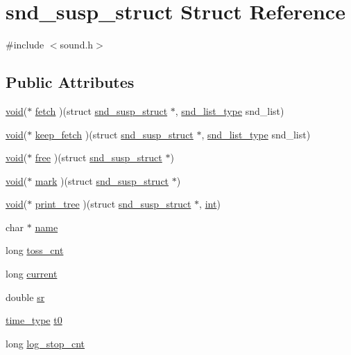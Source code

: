 \hypertarget{structsnd__susp__struct}{}\section{snd\+\_\+susp\+\_\+struct Struct Reference}
\label{structsnd__susp__struct}


{\ttfamily \#include $<$sound.\+h$>$}

\subsection*{Public Attributes}
\begin{DoxyCompactItemize}
\item 
\hyperlink{sound_8c_ae35f5844602719cf66324f4de2a658b3}{void}($\ast$ \hyperlink{structsnd__susp__struct_addb182d5c03b9b8f864e4fd9871f7722}{fetch} )(struct \hyperlink{structsnd__susp__struct}{snd\+\_\+susp\+\_\+struct} $\ast$, \hyperlink{sound_8h_ab05388854adb60c2855a70276d2ceb65}{snd\+\_\+list\+\_\+type} snd\+\_\+list)
\item 
\hyperlink{sound_8c_ae35f5844602719cf66324f4de2a658b3}{void}($\ast$ \hyperlink{structsnd__susp__struct_aef3e12bfaaf19ddbdb630ab20d40c3f7}{keep\+\_\+fetch} )(struct \hyperlink{structsnd__susp__struct}{snd\+\_\+susp\+\_\+struct} $\ast$, \hyperlink{sound_8h_ab05388854adb60c2855a70276d2ceb65}{snd\+\_\+list\+\_\+type} snd\+\_\+list)
\item 
\hyperlink{sound_8c_ae35f5844602719cf66324f4de2a658b3}{void}($\ast$ \hyperlink{structsnd__susp__struct_a39cc18ad890efb4f088c9d7636e3b5c0}{free} )(struct \hyperlink{structsnd__susp__struct}{snd\+\_\+susp\+\_\+struct} $\ast$)
\item 
\hyperlink{sound_8c_ae35f5844602719cf66324f4de2a658b3}{void}($\ast$ \hyperlink{structsnd__susp__struct_a077478e200df3bc42489892597f15d47}{mark} )(struct \hyperlink{structsnd__susp__struct}{snd\+\_\+susp\+\_\+struct} $\ast$)
\item 
\hyperlink{sound_8c_ae35f5844602719cf66324f4de2a658b3}{void}($\ast$ \hyperlink{structsnd__susp__struct_a4403d10e525f61c551eaa74440ee6b7d}{print\+\_\+tree} )(struct \hyperlink{structsnd__susp__struct}{snd\+\_\+susp\+\_\+struct} $\ast$, \hyperlink{xmltok_8h_a5a0d4a5641ce434f1d23533f2b2e6653}{int})
\item 
char $\ast$ \hyperlink{structsnd__susp__struct_a4d5fa6ba6ea209e5159d06ea00320041}{name}
\item 
long \hyperlink{structsnd__susp__struct_afc2b723720dc47ea6889620660684494}{toss\+\_\+cnt}
\item 
long \hyperlink{structsnd__susp__struct_a8f9e3b02c2fc0ccbb63d88b97d44c89c}{current}
\item 
double \hyperlink{structsnd__susp__struct_a89e4d9a7c1f50a9a0b4bca5ec1c253be}{sr}
\item 
\hyperlink{midifns_8h_a3f787491db5dbc75c21b27d54e9ebae6}{time\+\_\+type} \hyperlink{structsnd__susp__struct_a5e783b62d30b458070fb80dc0e112594}{t0}
\item 
long \hyperlink{structsnd__susp__struct_a8044ae9d2cfcbccffd2a60c9b6ce16fa}{log\+\_\+stop\+\_\+cnt}
\end{DoxyCompactItemize}


